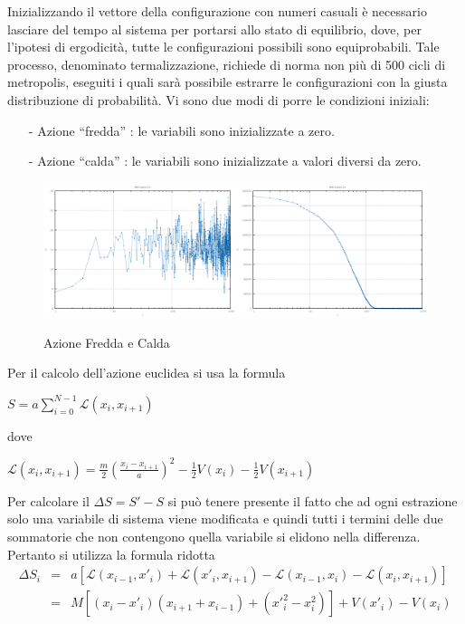 \documentclass[a4paper,11pt]{report}
\begin{document}
Inizializzando il vettore della configurazione con numeri casuali è necessario lasciare del tempo al sistema per portarsi allo stato di equilibrio, dove, per l'ipotesi di ergodicità, tutte le configurazioni possibili sono equiprobabili. Tale processo, denominato termalizzazione, richiede di norma non più di 500 cicli di metropolis, eseguiti i quali sarà possibile estrarre le configurazioni con la giusta distribuzione di probabilità. Vi sono due modi di porre le condizioni iniziali:
\begin{itemize}
   \small
   \item[-] Azione ``fredda'' : le variabili sono inizializzate a zero.
   \item[-] Azione ``calda'' : le variabili sono inizializzate a valori diversi da zero.
\end{itemize}
\begin{figure}[h]
\centering
\includegraphics[width=0.5\textwidth]{action1}\includegraphics[width=0.5\textwidth]{action2}
\caption{Azione Fredda e Calda}
\label{fig:action}
\end{figure}
Per il calcolo dell'azione euclidea si usa la formula
\begin{center}$S = a\displaystyle\sum\limits_{i=0}^{N-1} \mathcal{L}(x_{i},x_{i+1})$\end{center}
dove
\begin{center}$\mathcal{L}(x_{i},x_{i+1}) = \frac{m}{2}\left(\frac{x_{i}-x_{i+1}}{a}\right)^{2}-\frac{1}{2}V(x_{i})-\frac{1}{2}V(x_{i+1})$\end{center}
Per calcolare il $\Delta S = S'-S$ si può tenere presente il fatto che ad ogni estrazione solo una variabile di sistema viene modificata e quindi tutti i termini delle due sommatorie che non contengono quella variabile si elidono nella differenza. Pertanto si utilizza la formula ridotta
\begin{eqnarray*}
 \Delta S_i &=& a[\mathcal{L}(x_{i-1},x'_{i})+\mathcal{L}(x'_{i},x_{i+1})-\mathcal{L}(x_{i-1},x_{i})-\mathcal{L}(x_{i},x_{i+1})]\\
   &=& M[(x_{i}-x'_{i})(x_{i+1}+x_{i-1})+(x'^2_i-x^2_i)]+V(x'_i)-V(x_i)
\end{eqnarray*}
\end{document}
